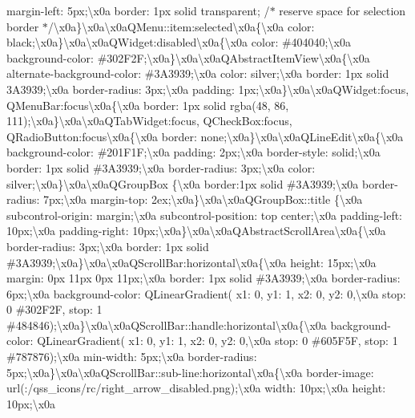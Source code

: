 margin-\/left\+: 5px;\textbackslash{}x0a border\+: 1px solid transparent; /$\ast$ reserve space for selection border $\ast$/\textbackslash{}x0a\}\textbackslash{}x0a\textbackslash{}x0a\+Q\+Menu\+::item\+:selected\textbackslash{}x0a\{\textbackslash{}x0a color\+: black;\textbackslash{}x0a\}\textbackslash{}x0a\textbackslash{}x0a\+Q\+Widget\+:disabled\textbackslash{}x0a\{\textbackslash{}x0a color\+: \#404040;\textbackslash{}x0a background-\/color\+: \#302\+F2\+F;\textbackslash{}x0a\}\textbackslash{}x0a\textbackslash{}x0a\+Q\+Abstract\+Item\+View\textbackslash{}x0a\{\textbackslash{}x0a alternate-\/background-\/color\+: \#3\+A3939;\textbackslash{}x0a color\+: silver;\textbackslash{}x0a border\+: 1px solid 3\+A3939;\textbackslash{}x0a border-\/radius\+: 3px;\textbackslash{}x0a padding\+: 1px;\textbackslash{}x0a\}\textbackslash{}x0a\textbackslash{}x0a\+Q\+Widget\+:focus, Q\+Menu\+Bar\+:focus\textbackslash{}x0a\{\textbackslash{}x0a border\+: 1px solid rgba(48, 86, 111);\textbackslash{}x0a\}\textbackslash{}x0a\textbackslash{}x0a\+Q\+Tab\+Widget\+:focus, Q\+Check\+Box\+:focus, Q\+Radio\+Button\+:focus\textbackslash{}x0a\{\textbackslash{}x0a border\+: none;\textbackslash{}x0a\}\textbackslash{}x0a\textbackslash{}x0a\+Q\+Line\+Edit\textbackslash{}x0a\{\textbackslash{}x0a background-\/color\+: \#201\+F1\+F;\textbackslash{}x0a padding\+: 2px;\textbackslash{}x0a border-\/style\+: solid;\textbackslash{}x0a border\+: 1px solid \#3\+A3939;\textbackslash{}x0a border-\/radius\+: 3px;\textbackslash{}x0a color\+: silver;\textbackslash{}x0a\}\textbackslash{}x0a\textbackslash{}x0a\+Q\+Group\+Box \{\textbackslash{}x0a border\+:1px solid \#3\+A3939;\textbackslash{}x0a border-\/radius\+: 7px;\textbackslash{}x0a margin-\/top\+: 2ex;\textbackslash{}x0a\}\textbackslash{}x0a\textbackslash{}x0a\+Q\+Group\+Box\+::title \{\textbackslash{}x0a subcontrol-\/origin\+: margin;\textbackslash{}x0a subcontrol-\/position\+: top center;\textbackslash{}x0a padding-\/left\+: 10px;\textbackslash{}x0a padding-\/right\+: 10px;\textbackslash{}x0a\}\textbackslash{}x0a\textbackslash{}x0a\+Q\+Abstract\+Scroll\+Area\textbackslash{}x0a\{\textbackslash{}x0a border-\/radius\+: 3px;\textbackslash{}x0a border\+: 1px solid \#3\+A3939;\textbackslash{}x0a\}\textbackslash{}x0a\textbackslash{}x0a\+Q\+Scroll\+Bar\+:horizontal\textbackslash{}x0a\{\textbackslash{}x0a height\+: 15px;\textbackslash{}x0a margin\+: 0px 11px 0px 11px;\textbackslash{}x0a border\+: 1px solid \#3\+A3939;\textbackslash{}x0a border-\/radius\+: 6px;\textbackslash{}x0a background-\/color\+: Q\+Linear\+Gradient( x1\+: 0, y1\+: 1, x2\+: 0, y2\+: 0,\textbackslash{}x0a stop\+: 0 \#302\+F2\+F, stop\+: 1 \#484846);\textbackslash{}x0a\}\textbackslash{}x0a\textbackslash{}x0a\+Q\+Scroll\+Bar\+::handle\+:horizontal\textbackslash{}x0a\{\textbackslash{}x0a background-\/color\+: Q\+Linear\+Gradient( x1\+: 0, y1\+: 1, x2\+: 0, y2\+: 0,\textbackslash{}x0a stop\+: 0 \#605\+F5\+F, stop\+: 1 \#787876);\textbackslash{}x0a min-\/width\+: 5px;\textbackslash{}x0a border-\/radius\+: 5px;\textbackslash{}x0a\}\textbackslash{}x0a\textbackslash{}x0a\+Q\+Scroll\+Bar\+::sub-\/line\+:horizontal\textbackslash{}x0a\{\textbackslash{}x0a border-\/image\+: url(\+:/qss\+\_\+icons/rc/right\+\_\+arrow\+\_\+disabled.\+png);\textbackslash{}x0a width\+: 10px;\textbackslash{}x0a height\+: 10px;\textbackslash{}x0a 